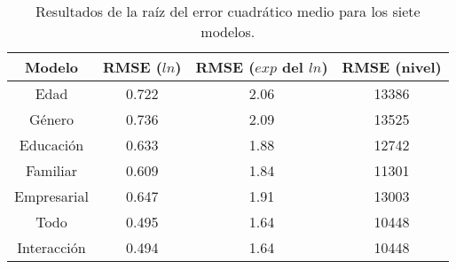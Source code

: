 \begin{table}[H]
\centering
\caption{Resultados de la raíz del error cuadrático medio para los siete modelos.} 
\label{Tab:RMSE}
\begin{tabular}{cccc}
  \hline
\textbf{Modelo} & \textbf{RMSE ($ln$)} & \textbf{RMSE} ($exp$ del $ln$) & \textbf{RMSE} (nivel) \\ 
  \hline
Edad & 0.722 & 2.06 & 13386 \\ 
  Género & 0.736 & 2.09 & 13525 \\ 
  Educación & 0.633 & 1.88 & 12742 \\ 
  Familiar & 0.609 & 1.84 & 11301 \\ 
  Empresarial & 0.647 & 1.91 & 13003 \\ 
  Todo & 0.495 & 1.64 & 10448 \\ 
  Interacción & 0.494 & 1.64 & 10448 \\ 
   \hline
\end{tabular}
\end{table}
